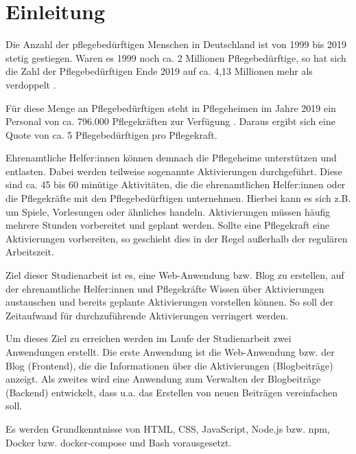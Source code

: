 \chapter{Einleitung}

Die Anzahl der pflegebedürftigen Menschen in Deutschland ist von 1999 bis 2019 stetig gestiegen. Waren es 1999 noch ca. 2 Millionen Pflegebedürftige, so hat sich die Zahl der Pflegebedürftigen Ende 2019 auf ca. 4,13 Millionen mehr als verdoppelt \cite[vgl.][]{PflegebedarfStatista}.

Für diese Menge an Pflegebedürftigen steht in Pflegeheimen im Jahre 2019 ein Personal von ca. 796.000 Pflegekräften zur Verfügung \cite[vgl.][]{PflegepersonalStatista}. Daraus ergibt sich eine Quote von ca. 5 Pflegebedürftigen pro Pflegekraft.

Ehrenamtliche Helfer:innen können demnach die Pflegeheime unterstützen und entlasten. Dabei werden teilweise sogenannte Aktivierungen durchgeführt. Diese sind ca. 45 bis 60 minütige Aktivitäten, die die ehrenamtlichen Helfer:innen oder die Pflegekräfte mit den Pflegebedürftigen unternehmen. Hierbei kann es sich z.B. um Spiele, Vorlesungen oder ähnliches handeln. Aktivierungen müssen häufig mehrere Stunden vorbereitet und geplant werden. Sollte eine Pflegekraft eine Aktivierungen vorbereiten, so geschieht dies in der Regel außerhalb der regulären Arbeitszeit.

Ziel dieser Studienarbeit ist es, eine Web-Anwendung bzw. Blog zu erstellen, auf der ehrenamtliche Helfer:innen und Pflegekräfte Wissen über Aktivierungen austauschen und bereits geplante Aktivierungen vorstellen können. So soll der Zeitaufwand für durchzuführende Aktivierungen verringert werden.

Um dieses Ziel zu erreichen werden im Laufe der Studienarbeit zwei Anwendungen erstellt. Die erste Anwendung ist die Web-Anwendung bzw. der Blog (Frontend), die die Informationen über die Aktivierungen (Blogbeiträge) anzeigt. Als zweites wird eine Anwendung zum Verwalten der Blogbeiträge (Backend) entwickelt, dass u.a. das Erstellen von neuen Beiträgen vereinfachen soll.

Es werden Grundkenntnisse von HTML, CSS, JavaScript, Node.js bzw. npm, Docker bzw. docker-compose und Bash vorausgesetzt.
